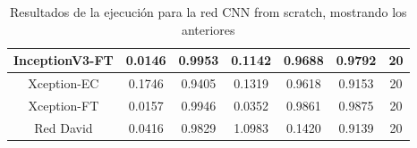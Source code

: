\documentclass[11pt,a4paper]{article}
\theoremstyle{definition}
\begin{document}
\begin{table}[H]
\begin{tabular}{|c|c|c|c|c|c|c|}
\hline
InceptionV3-FT                                      & \textcolor[rgb]{0.129,0.129,0.129}{0.0146 } & \textcolor[rgb]{0.129,0.129,0.129}{0.9953 } & \textcolor[rgb]{0.129,0.129,0.129}{0.1142 }                                                                       & \textcolor[rgb]{0.129,0.129,0.129}{0.9688}                                                                             & \textcolor[rgb]{0.129,0.129,0.129}{0.9792}                                                                       & 20                                                                                                              \\
\hline
Xception-EC                                            & \textcolor[rgb]{0.129,0.129,0.129}{0.1746 } & \textcolor[rgb]{0.129,0.129,0.129}{0.9405 } & \textcolor[rgb]{0.129,0.129,0.129}{0.1319 }                                                                       & \textcolor[rgb]{0.129,0.129,0.129}{0.9618}                                                                             & \textcolor[rgb]{0.129,0.129,0.129}{0.9153}                                                                       & 20                                                                                                              \\
\hline
Xception-FT                        & \textcolor[rgb]{0.129,0.129,0.129}{0.0157 } & \textcolor[rgb]{0.129,0.129,0.129}{0.9946 } & \textcolor[rgb]{0.129,0.129,0.129}{0.0352 }                                                                       & \textcolor[rgb]{0.129,0.129,0.129}{0.9861}                                                                             & \textcolor[rgb]{0.129,0.129,0.129}{0.9875}                                                                       & 20                                                                                                              \\
\hline
\rowcolor{green} Red David                        & \textcolor[rgb]{0.129,0.129,0.129}{0.0416 } & \textcolor[rgb]{0.129,0.129,0.129}{0.9829 } & \textcolor[rgb]{0.129,0.129,0.129}{1.0983 }                                                                       & \textcolor[rgb]{0.129,0.129,0.129}{0.1420 }                                                                             & \textcolor[rgb]{0.129,0.129,0.129}{0.9139}                                                                       & 20                                                                                                              \\
\hline
\end{tabular}
\caption{Resultados de la ejecución para la red CNN from scratch, mostrando los anteriores}

\end{table}
\end{document}
